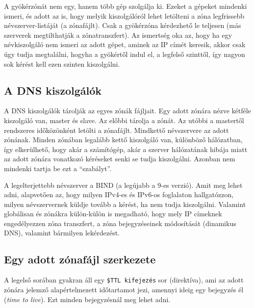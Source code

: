\documentclass[fleqn,10pt,a4paper]{article}
\theoremstyle{magyar}
\begin{document}
  A gyökérzónát nem egy, hanem több gép szolgálja ki. Ezeket a gépeket mindenki ismeri, és adott az is, hogy melyik
  kiszolgálóról lehet letölteni a zóna legfrissebb névszerver-listáját (a zónafájlt). Csak a gyökérzóna kérdezhető le
  teljesen (más szerverek megtilthatják a zónatranszfert). Az ismertség oka az, hogy ha egy névkiszolgáló nem ismeri az
  adott gépet, aminek az IP címét keresik, akkor csak úgy tudja megtalálni, hogyha a gyökértől indul el, a legfelső
  szinttől, így nagyon sok kérést kell ezen szinten kiszolgálni.

  
  \subsection{A DNS kiszolgálók}
  A DNS kiszolgálók tárolják az egyes zónák fájljait. Egy adott zónára nézve kétféle kiszolgáló van, master és slave. Az
  előbbi tárolja a zónát. Az utóbbi a mastertől rendszeres időközönként letölti a zónafájlt. Mindkettő névszervere az
  adott zónának. Minden zónában legalább kettő kiszolgáló van, különböző hálózatban, így elkerülhető, hogy akár a
  számítógép, akár a szerver hálózatának hibája miatt az adott zónára vonatkozó kéréseket senki se tudja
  kiszolgálni. Azonban nem mindenki tartja be ezt a ``szabályt''.

  A legelterjettebb névszerver a BIND (a legújabb a 9-es verzió). Amit meg lehet adni, alapvetően az, hogy milyen
  IPv4-es és IPv6-os foglalaton hallgatózzon, milyen névszervernek küldje tovább a kérést, ha nem tudja
  kiszolgálni. Valamint globálisan és zónákra külön-külön is megadható, hogy mely IP címeknek engedélyezzen zóna
  transzfert, a zóna bejegyzéseinek módosítását (dinamikus DNS), valamint bármilyen lekérdezést.

  \subsection{Egy adott zónafájl szerkezete}
  A legelső sorában gyakran áll egy \texttt{\$TTL kifejezés} sor (direktíva), ami az adott zónára jelemző alapértelmezett
  időtartamot jezi, amennyi ideig egy bejegyzés él (\emph{time to live}). Ezt minden bejegyzésnál meg lehet adni.
  
\end{document}
